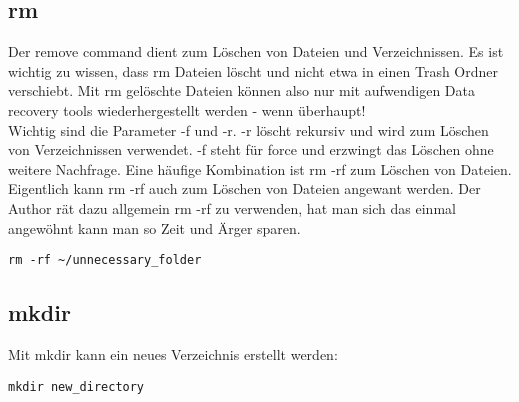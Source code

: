 \documentclass[10pt,paper=a4,final]{scrartcl}
\begin{document}
\subsection{rm}
Der remove command dient zum L\"oschen von Dateien und Verzeichnissen. Es ist wichtig zu wissen, dass rm Dateien l\"oscht und nicht etwa in einen Trash Ordner verschiebt. Mit rm gel\"oschte Dateien k\"onnen also nur mit aufwendigen Data recovery tools wiederhergestellt werden - wenn \"uberhaupt!\\
Wichtig sind die Parameter -f und -r. -r l\"oscht rekursiv und wird zum L\"oschen von Verzeichnissen verwendet. -f steht f\"ur force und erzwingt das L\"oschen ohne weitere Nachfrage. Eine h\"aufige Kombination ist rm -rf zum L\"oschen von Dateien. Eigentlich kann rm -rf auch zum L\"oschen von Dateien angewant werden. Der Author r\"at dazu allgemein rm -rf zu verwenden, hat man sich das einmal angew\"ohnt kann man so Zeit und \"Arger sparen.
\begin{lstlisting}[frame=single]
rm -rf ~/unnecessary_folder
\end{lstlisting}
\subsection{mkdir}
Mit mkdir kann ein neues Verzeichnis erstellt werden:
\begin{lstlisting}[frame=single]
mkdir new_directory
\end{lstlisting}
\end{document}

